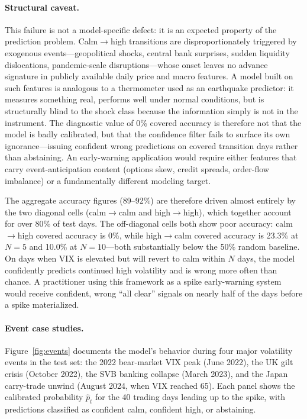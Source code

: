 \documentclass[11pt]{article}
\begin{document}
\paragraph{Structural caveat.}
This failure is not a model-specific defect: it is an expected property of the prediction problem. Calm$\to$high transitions are disproportionately triggered by exogenous events---geopolitical shocks, central bank surprises, sudden liquidity dislocations, pandemic-scale disruptions---whose onset leaves no advance signature in publicly available daily price and macro features. A model built on such features is analogous to a thermometer used as an earthquake predictor: it measures something real, performs well under normal conditions, but is structurally blind to the shock class because the information simply is not in the instrument. The diagnostic value of 0\% covered accuracy is therefore not that the model is badly calibrated, but that the confidence filter fails to surface its own ignorance---issuing confident wrong predictions on covered transition days rather than abstaining. An early-warning application would require either features that carry event-anticipation content (options skew, credit spreads, order-flow imbalance) or a fundamentally different modeling target.

The aggregate accuracy figures (89--92\%) are therefore driven almost entirely by the two diagonal cells (calm$\to$calm and high$\to$high), which together account for over 80\% of test days. The off-diagonal cells both show poor accuracy: calm$\to$high covered accuracy is 0\%, while high$\to$calm covered accuracy is 23.3\% at $N = 5$ and 10.0\% at $N = 10$---both substantially below the 50\% random baseline. On days when VIX is elevated but will revert to calm within $N$ days, the model confidently predicts continued high volatility and is wrong more often than chance. A practitioner using this framework as a spike early-warning system would receive confident, wrong ``all clear'' signals on nearly half of the days before a spike materialized.

\paragraph{Event case studies.}
Figure~\ref{fig:events} documents the model's behavior during four major volatility events in the test set: the 2022 bear-market VIX peak (June 2022), the UK gilt crisis (October 2022), the SVB banking collapse (March 2023), and the Japan carry-trade unwind (August 2024, when VIX reached 65). Each panel shows the calibrated probability $\hat{p}_t$ for the 40 trading days leading up to the spike, with predictions classified as confident calm, confident high, or abstaining.
\end{document}
